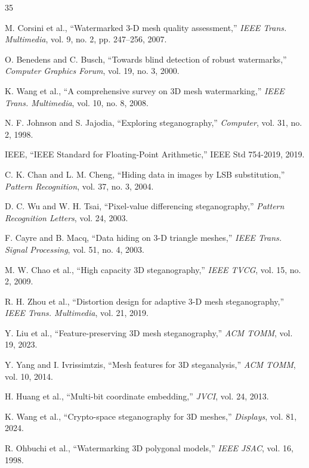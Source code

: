 \documentclass[conference]{IEEEtran}
\begin{document}
\begin{thebibliography}{35}

M. Corsini et al., ``Watermarked 3-D mesh quality assessment,'' \textit{IEEE Trans. Multimedia}, vol. 9, no. 2, pp. 247--256, 2007.

O. Benedens and C. Busch, ``Towards blind detection of robust watermarks,'' \textit{Computer Graphics Forum}, vol. 19, no. 3, 2000.

K. Wang et al., ``A comprehensive survey on 3D mesh watermarking,'' \textit{IEEE Trans. Multimedia}, vol. 10, no. 8, 2008.

N. F. Johnson and S. Jajodia, ``Exploring steganography,'' \textit{Computer}, vol. 31, no. 2, 1998.

IEEE, ``IEEE Standard for Floating-Point Arithmetic,'' IEEE Std 754-2019, 2019.

C. K. Chan and L. M. Cheng, ``Hiding data in images by LSB substitution,'' \textit{Pattern Recognition}, vol. 37, no. 3, 2004.

D. C. Wu and W. H. Tsai, ``Pixel-value differencing steganography,'' \textit{Pattern Recognition Letters}, vol. 24, 2003.

F. Cayre and B. Macq, ``Data hiding on 3-D triangle meshes,'' \textit{IEEE Trans. Signal Processing}, vol. 51, no. 4, 2003.

M. W. Chao et al., ``High capacity 3D steganography,'' \textit{IEEE TVCG}, vol. 15, no. 2, 2009.

R. H. Zhou et al., ``Distortion design for adaptive 3-D mesh steganography,'' \textit{IEEE Trans. Multimedia}, vol. 21, 2019.

Y. Liu et al., ``Feature-preserving 3D mesh steganography,'' \textit{ACM TOMM}, vol. 19, 2023.

Y. Yang and I. Ivrissimtzis, ``Mesh features for 3D steganalysis,'' \textit{ACM TOMM}, vol. 10, 2014.

H. Huang et al., ``Multi-bit coordinate embedding,'' \textit{JVCI}, vol. 24, 2013.

K. Wang et al., ``Crypto-space steganography for 3D meshes,'' \textit{Displays}, vol. 81, 2024.

R. Ohbuchi et al., ``Watermarking 3D polygonal models,'' \textit{IEEE JSAC}, vol. 16, 1998.


\end{thebibliography}
\end{document}
